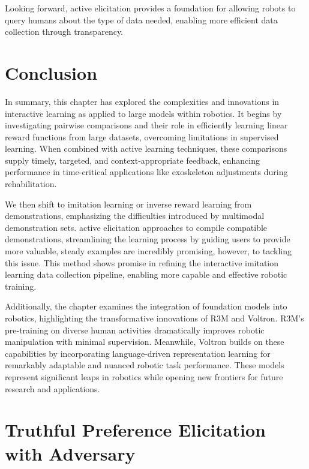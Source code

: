 \documentclass[
  letterpaper,
  numbers=noenddot,
  DIV=11,
  oneside]{scrreprt}
\theoremstyle{remark}
\begin{document}
Looking forward, active elicitation provides a foundation for allowing
robots to query humans about the type of data needed, enabling more
efficient data collection through transparency.

\section{Conclusion}\label{conclusion-1}

In summary, this chapter has explored the complexities and innovations
in interactive learning as applied to large models within robotics. It
begins by investigating pairwise comparisons and their role in
efficiently learning linear reward functions from large datasets,
overcoming limitations in supervised learning. When combined with active
learning techniques, these comparisons supply timely, targeted, and
context-appropriate feedback, enhancing performance in time-critical
applications like exoskeleton adjustments during rehabilitation.

We then shift to imitation learning or inverse reward learning from
demonstrations, emphasizing the difficulties introduced by multimodal
demonstration sets. active elicitation approaches to compile compatible
demonstrations, streamlining the learning process by guiding users to
provide more valuable, steady examples are incredibly promising,
however, to tackling this issue. This method shows promise in refining
the interactive imitation learning data collection pipeline, enabling
more capable and effective robotic training.

Additionally, the chapter examines the integration of foundation models
into robotics, highlighting the transformative innovations of R3M and
Voltron. R3M's pre-training on diverse human activities dramatically
improves robotic manipulation with minimal supervision. Meanwhile,
Voltron builds on these capabilities by incorporating language-driven
representation learning for remarkably adaptable and nuanced robotic
task performance. These models represent significant leaps in robotics
while opening new frontiers for future research and applications.

\section{Truthful Preference Elicitation with
Adversary}\label{truthful-preference-elicitation-with-adversary}
\end{document}

